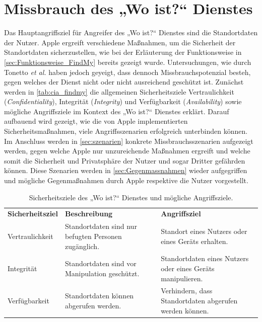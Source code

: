 \section{Missbrauch des „Wo ist?“ Dienstes}
\label{sec:Missbrauch}

Das Hauptangriffsziel für Angreifer des „Wo ist?“ Dienstes sind die Standortdaten der Nutzer.
Apple ergreift verschiedene Maßnahmen, um die Sicherheit der Standortdaten sicherzustellen, wie bei der Erläuterung der Funktionsweise in \autoref{sec:Funktionsweise_FindMy} bereits gezeigt wurde.
Untersuchungen, wie durch Tonetto \textit{et al.} \cite{Tonetto_FindMy} haben jedoch geyeigt, dass dennoch Missbrauchspotenzial besteh, gegen welches der Dienst nicht oder nicht ausreichend geschützt ist.
Zunächst werden in \autoref{tab:cia_findmy} die allgemeinen Sicherheitsziele Vertraulichkeit (\textit{Confidentiality}), Integrität (\textit{Integrity}) und Verfügbarkeit (\textit{Availability}) sowie mögliche Angriffsziele im Kontext des „Wo ist?“ Dienstes erklärt.
Darauf aufbauend wird gezeigt, wie die von Apple implementierten Sicherheitsmaßnahmen, viele Angriffsszenarien erfolgreich unterbinden können.
Im Anschluss werden in \autoref{sec:szenarien} konkrete Missbrauchsszenarien aufgezeigt werden, gegen welche Apple nur unzureichende Maßnahmen ergreift und welche somit die Sicherheit und Privatsphäre der Nutzer und sogar Dritter gefährden können.
Diese Szenarien werden in \autoref{sec:Gegenmassnahmen} wieder aufgegriffen und mögliche Gegenmaßnahmen durch Apple respektive die Nutzer vorgestellt.

\begin{table}[h]
  \caption{Sicherheitsziele des „Wo ist?“ Dienstes und mögliche Angriffsziele.}
  \label{tab:cia_findmy}
  \begin{tabularx}{\textwidth}{ |l|X|X| }
    \hline
    \textbf{Sicherheitsziel}  & \textbf{Beschreibung}                                               & \textbf{Angriffsziel}                                           \\
    \Xhline{0.5mm}
    \hline
    Vertraulichkeit           & Standortdaten sind nur befugten Personen zugänglich.                & Standort eines Nutzers oder eines Geräts erhalten.              \\
    \hline
    Integrität                & Standortdaten sind vor Manipulation geschützt.                      & Standortdaten eines Nutzers oder eines Geräts manipulieren.     \\
    \hline
    Verfügbarkeit             & Standortdaten können abgerufen werden.                              & Verhindern, dass Standortdaten abgerufen werden können.         \\
    \hline
  \end{tabularx}
\end{table}

